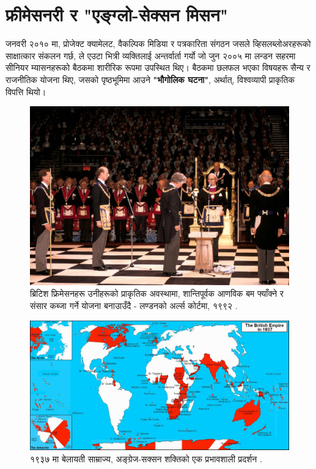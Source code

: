 \documentclass[10pt,twocolumn,letterpaper]{article}
\begin{document}
\section{फ्रीमेसनरी र "एङ्ग्लो-सेक्सन मिसन"}

जनवरी २०१० मा, प्रोजेक्ट क्यामेलट, वैकल्पिक मिडिया र पत्रकारिता संगठन जसले व्हिसलब्लोअरहरूको साक्षात्कार संकलन गर्छ, ले \cite{4,6} एउटा भित्री व्यक्तिलाई अन्तर्वार्ता गर्यो जो जुन २००५ मा लन्डन सहरमा सीनियर म्यासनहरूको बैठकमा शारीरिक रूपमा उपस्थित थिए। बैठकमा छलफल भएका विषयहरू सैन्य र राजनीतिक योजना थिए, जसको पृष्ठभूमिमा आउने \textbf{"भौगोलिक घटना"}, अर्थात्, विश्वव्यापी प्राकृतिक विपत्ति थियो।

\begin{figure}[b]
\begin{center}
\includegraphics[width=1\linewidth]{freemason.jpg}
\end{center}
   \caption{ब्रिटिश फ्रिमेसनहरू उनीहरूको प्राकृतिक अवस्थामा, शान्तिपूर्वक आणविक बम फ्याँक्ने र संसार कब्जा गर्ने योजना बनाउाउँदै - लण्डनको अर्ल्स कोर्टमा, १९९२ \cite{5}.}
\label{fig:1}
\label{fig:onecol}
\end{figure}

\begin{figure}[t]
\begin{center}
\includegraphics[width=1\textwidth]{british.jpg}
\end{center}
   \caption{१९३७ मा बेलायती साम्राज्य, अङ्ग्रेज-सक्सन शक्तिको एक प्रभावशाली प्रदर्शन \cite{14}.}
   \label{fig:2}
\end{figure}
\end{document}
